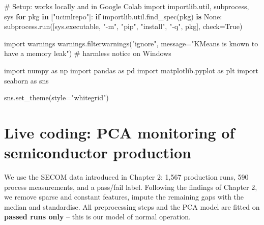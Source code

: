 \documentclass[
  letterpaper,
  DIV=11,
  numbers=noendperiod]{scrreprt}
\newenvironment{Shaded}{\begin{snugshade}}{\end{snugshade}}
\newcommand{\CommentTok}[1]{\textcolor[rgb]{0.37,0.37,0.37}{#1}}
\newcommand{\ControlFlowTok}[1]{\textcolor[rgb]{0.00,0.23,0.31}{\textbf{#1}}}
\newcommand{\ImportTok}[1]{\textcolor[rgb]{0.00,0.46,0.62}{#1}}
\newcommand{\KeywordTok}[1]{\textcolor[rgb]{0.00,0.23,0.31}{\textbf{#1}}}
\newcommand{\NormalTok}[1]{\textcolor[rgb]{0.00,0.23,0.31}{#1}}
\newcommand{\OperatorTok}[1]{\textcolor[rgb]{0.37,0.37,0.37}{#1}}
\newcommand{\StringTok}[1]{\textcolor[rgb]{0.13,0.47,0.30}{#1}}
\newcommand{\VariableTok}[1]{\textcolor[rgb]{0.07,0.07,0.07}{#1}}
\begin{document}
\begin{Shaded}
\begin{Highlighting}[]
\CommentTok{\# Setup: works locally and in Google Colab}
\ImportTok{import}\NormalTok{ importlib.util, subprocess, sys}
\ControlFlowTok{for}\NormalTok{ pkg }\KeywordTok{in}\NormalTok{ [}\StringTok{"ucimlrepo"}\NormalTok{]:}
    \ControlFlowTok{if}\NormalTok{ importlib.util.find\_spec(pkg) }\KeywordTok{is} \VariableTok{None}\NormalTok{:}
\NormalTok{        subprocess.run([sys.executable, }\StringTok{"{-}m"}\NormalTok{, }\StringTok{"pip"}\NormalTok{, }\StringTok{"install"}\NormalTok{, }\StringTok{"{-}q"}\NormalTok{, pkg], check}\OperatorTok{=}\VariableTok{True}\NormalTok{)}

\ImportTok{import}\NormalTok{ warnings}
\NormalTok{warnings.filterwarnings(}\StringTok{"ignore"}\NormalTok{, message}\OperatorTok{=}\StringTok{"KMeans is known to have a memory leak"}\NormalTok{)   }\CommentTok{\# harmless notice on Windows}

\ImportTok{import}\NormalTok{ numpy }\ImportTok{as}\NormalTok{ np}
\ImportTok{import}\NormalTok{ pandas }\ImportTok{as}\NormalTok{ pd}
\ImportTok{import}\NormalTok{ matplotlib.pyplot }\ImportTok{as}\NormalTok{ plt}
\ImportTok{import}\NormalTok{ seaborn }\ImportTok{as}\NormalTok{ sns}

\NormalTok{sns.set\_theme(style}\OperatorTok{=}\StringTok{"whitegrid"}\NormalTok{)}
\end{Highlighting}
\end{Shaded}

\section{Live coding: PCA monitoring of semiconductor
production}\label{live-coding-pca-monitoring-of-semiconductor-production}

We use the SECOM data introduced in Chapter 2: 1,567 production runs,
590 process measurements, and a pass/fail label. Following the findings
of Chapter 2, we remove sparse and constant features, impute the
remaining gaps with the median and standardise. All preprocessing steps
and the PCA model are fitted on \textbf{passed runs only} -- this is our
model of normal operation.
\end{document}
